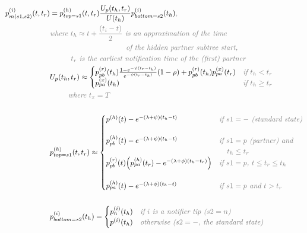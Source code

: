 \documentclass[10pt,letterpaper]{article}
\begin{document}
\begin{equation}
\begin{split}
p_{m(s1,s2)}^{(i)}(t,t_r) &= p_{top=s1}^{(h)}(t, t_r)\frac{U_p(t_h,t_r)}{U(t_h)}p_{bottom=s2}^{(i)}(t_h)\textit{\color{gray},}\\
&\textit{\color{gray}where $t_{h} \approx t + \frac{(t_i - t)}{2}$ is an approximation of the time}\\
&\textit{\color{gray}~~~~~~~~~~~~~~~~~~~~~~~~~~~~~of the hidden partner subtree start,}\\
&\textit{\color{gray}~~~~~~~~$t_{r}$ is the earliest notification time of the (first) partner}\\
&U_p(t_h, t_r) \approx 
\begin{cases}
p_{pb}^{(r)}(t_h) \frac{1 - e^{-\psi(t_r - t_h)}}{e^{-\psi(t_r - t_h)}} (1 - \rho) + p_{pb}^{(r)}(t_h) p_{pa}^{(x)}(t_r) & \textit{\color{gray}if $t_h < t_r$}\\
p_{pa}^{(x)}(t_h) & \textit{\color{gray}if $t_h \geq t_r$}\\
\end{cases}\\
&\textit{\color{gray}~~~~~~~where $t_x =T$}\\
&\\
& p_{top=s1}^{(h)}(t, t_r) \approx 
\begin{cases}
p^{(h)}(t) -e^{-(\lambda + \psi)(t_{h} - t)}&\textit{\color{gray} if $s1=-$ (standard state)}\\
& \\
p_{pb}^{(h)}(t) -e^{-(\lambda + \psi)(t_{h} - t)}&\textit{\color{gray} if $s1=p$ (partner) and}\\
&\textit{\color{gray} ~~ $t_h \leq t_r$}\\
p_{pb}^{(r)}(t)\Big(p_{pa}^{(h)}(t_r) -e^{-(\lambda + \phi)(t_{h} - t_r)}\Big)&\textit{\color{gray} if $s1=p$, $t \leq t_r \leq t_h$}\\
&\\
p_{pa}^{(h)}(t) -e^{-(\lambda + \phi)(t_{h} - t)}&\textit{\color{gray} if $s1=p$ and $t > t_r$}\\
\end{cases}\\
&\\
& p_{bottom=s2}^{(i)}(t_h) = 
\begin{cases}
p_n^{(i)}(t_h)&\textit{\color{gray} if $i$ is a notifier tip ($s2=n$)}\\
p^{(i)}(t_h)&\textit{\color{gray} otherwise ($s2=-$, the standard state)}\\
\end{cases}\\

\end{split}
\end{equation}
\end{document}
